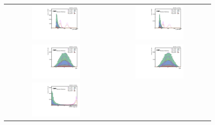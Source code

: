 \begin{figure}[t]
  \centering
  \begin{tabular}{cc}
    \includegraphics[width=0.5\textwidth]{Figures/MC_N1/pt_j0.pdf} &
    \includegraphics[width=0.5\textwidth]{Figures/MC_N1/pt_j1.pdf} \\
     \includegraphics[width=0.5\textwidth]{Figures/MC_N1/eta_j0.pdf} &
    \includegraphics[width=0.5\textwidth]{Figures/MC_N1/eta_j1.pdf} \\
     \includegraphics[width=0.5\textwidth]{Figures/MC_N1/doubleSV_j0.pdf} &

\end{tabular}
\end{figure}
